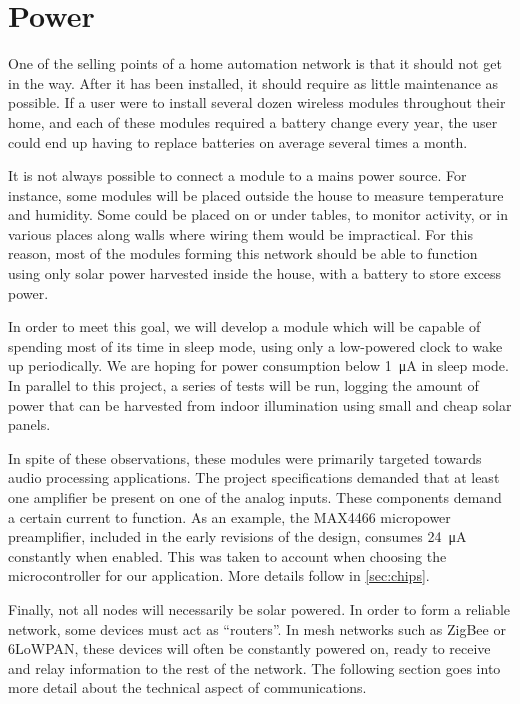 \section{Power}\label{sec:power}

One of the selling points of a home automation network is that it should not get
in the way. After it has been installed, it should require as little maintenance
as possible. If a user were to install several dozen wireless modules throughout
their home, and each of these modules required a battery change every year, the
user could end up having to replace batteries on average several times a month. 

It is not always possible to connect a module to a mains power source. For
instance, some modules will be placed outside the house to measure temperature
and humidity. Some could be placed on or under tables, to monitor activity, or
in various places along walls where wiring them would be impractical. For this
reason, most of the modules forming this network should be able to function
using only solar power harvested inside the house, with a battery to store
excess power.

In order to meet this goal, we will develop a module which will be capable of
spending most of its time in sleep mode, using only a low-powered clock to wake
up periodically. We are hoping for power consumption below
\SI{1}{\micro\ampere} in sleep mode. In parallel to this project, a series of
tests will be run, logging the amount of power that can be harvested from indoor
illumination using small and cheap solar panels.

In spite of these observations, these modules were primarily targeted towards
audio processing applications. The project specifications demanded that at least
one amplifier be present on one of the analog inputs. These components demand
a certain current to function. As an example, the MAX4466 micropower
preamplifier, included in the early revisions of the design, consumes
\SI{24}{\micro\ampere} constantly when enabled. This was taken to account when
choosing the microcontroller for our application. More details follow in
\autoref{sec:chips}.

Finally, not all nodes will necessarily be solar powered. In order to form
a reliable network, some devices must act as ``routers''. In mesh networks such
as ZigBee or \ac{6LoWPAN}, these devices will often be constantly powered on,
ready to receive and relay information to the rest of the network. The following
section goes into more detail about the technical aspect of communications.

